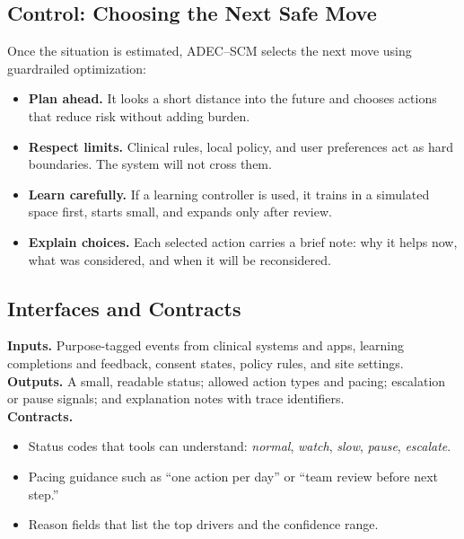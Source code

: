 \documentclass[12pt]{article}
\begin{document}
\subsection*{Control: Choosing the Next Safe Move}
Once the situation is estimated, ADEC–SCM selects the next move using guardrailed optimization:
\begin{itemize}[leftmargin=*]
  \item \textbf{Plan ahead.} It looks a short distance into the future and chooses actions that reduce risk without adding burden.
  \item \textbf{Respect limits.} Clinical rules, local policy, and user preferences act as hard boundaries. The system will not cross them.
  \item \textbf{Learn carefully.} If a learning controller is used, it trains in a simulated space first, starts small, and expands only after review.
  \item \textbf{Explain choices.} Each selected action carries a brief note: why it helps now, what was considered, and when it will be reconsidered.
\end{itemize}

\subsection*{Interfaces and Contracts}
\textbf{Inputs.} Purpose-tagged events from clinical systems and apps, learning completions and feedback, consent states, policy rules, and site settings. \\
\textbf{Outputs.} A small, readable status; allowed action types and pacing; escalation or pause signals; and explanation notes with trace identifiers. \\
\textbf{Contracts.}
\begin{itemize}[leftmargin=*]
  \item Status codes that tools can understand: \textit{normal}, \textit{watch}, \textit{slow}, \textit{pause}, \textit{escalate}.
  \item Pacing guidance such as “one action per day” or “team review before next step.”
  \item Reason fields that list the top drivers and the confidence range.
\end{itemize}
\end{document}

